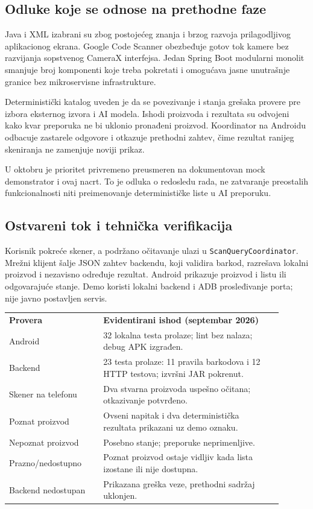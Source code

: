 \documentclass[12pt,a4paper]{article}
\begin{document}
\subsection{Odluke koje se odnose na prethodne faze}
Java i XML izabrani su zbog postojećeg znanja i brzog razvoja prilagodljivog aplikacionog ekrana. Google Code Scanner obezbeđuje gotov tok kamere bez razvijanja sopstvenog CameraX interfejsa. Jedan Spring Boot modularni monolit smanjuje broj komponenti koje treba pokretati i omogućava jasne unutrašnje granice bez mikroservisne infrastrukture.

Deterministički katalog uveden je da se povezivanje i stanja grešaka provere pre izbora eksternog izvora i AI modela. Ishodi proizvoda i rezultata su odvojeni kako kvar preporuka ne bi uklonio pronađeni proizvod. Koordinator na Androidu odbacuje zastarele odgovore i otkazuje prethodni zahtev, čime rezultat ranijeg skeniranja ne zamenjuje noviji prikaz.

U oktobru je prioritet privremeno preusmeren na dokumentovan mock demonstrator i ovaj nacrt. To je odluka o redosledu rada, ne zatvaranje preostalih funkcionalnosti niti preimenovanje determinističke liste u AI preporuku.

\subsection{Ostvareni tok i tehnička verifikacija}

Korisnik pokreće skener, a podržano očitavanje ulazi u \texttt{ScanQueryCoordinator}. Mrežni klijent šalje JSON zahtev backendu, koji validira barkod, razrešava lokalni proizvod i nezavisno određuje rezultat. Android prikazuje proizvod i listu ili odgovarajuće stanje. Demo koristi lokalni backend i ADB prosleđivanje porta; nije javno postavljen servis.

\begin{center}
\small
\begin{tabular}{p{0.31\linewidth}p{0.59\linewidth}}
\textbf{Provera} & \textbf{Evidentirani ishod (septembar 2026)} \\
Android & 32 lokalna testa prolaze; lint bez nalaza; debug APK izgrađen. \\
Backend & 23 testa prolaze: 11 pravila barkodova i 12 HTTP testova; izvršni JAR pokrenut. \\
Skener na telefonu & Dva stvarna proizvoda uspešno očitana; otkazivanje potvrđeno. \\
Poznat proizvod & Ovseni napitak i dva deterministička rezultata prikazani uz demo oznaku. \\
Nepoznat proizvod & Posebno stanje; preporuke neprimenljive. \\
Prazno/nedostupno & Poznat proizvod ostaje vidljiv kada lista izostane ili nije dostupna. \\
Backend nedostupan & Prikazana greška veze, prethodni sadržaj uklonjen. \\
\end{tabular}
\end{center}
\end{document}
